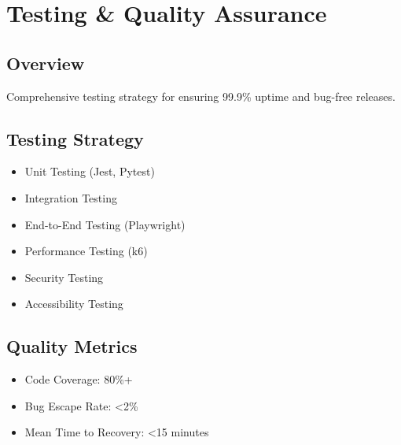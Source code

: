\chapter{Testing \& Quality Assurance}
\label{ch:testing-qa}

\section{Overview}
Comprehensive testing strategy for \lifeos{} ensuring 99.9\% uptime and bug-free releases.

\section{Testing Strategy}
\begin{itemize}
    \item Unit Testing (Jest, Pytest)
    \item Integration Testing
    \item End-to-End Testing (Playwright)
    \item Performance Testing (k6)
    \item Security Testing
    \item Accessibility Testing
\end{itemize}

\section{Quality Metrics}
\begin{itemize}
    \item Code Coverage: 80\%+
    \item Bug Escape Rate: <2\%
    \item Mean Time to Recovery: <15 minutes
\end{itemize}
